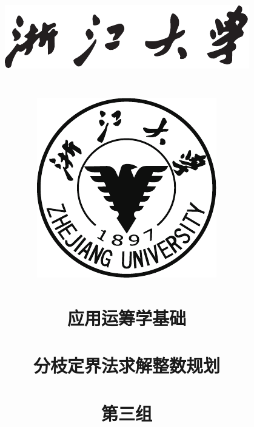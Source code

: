 \lhead{\leftmark}
\renewcommand{\headrulewidth}{0.5pt}

\title{
	\includegraphics[scale=1.5]{layout/zju_1.pdf}\\~\\
	\includegraphics[scale=1.5]{layout/zju_2.pdf}\\
	~\\
	\Huge{应用运筹学基础\\
		 ~\\
	}
	\huge{
		分枝定界法求解整数规划 \\
		~\\
	}
	\huge{
		第三组
	}
}
\date{}